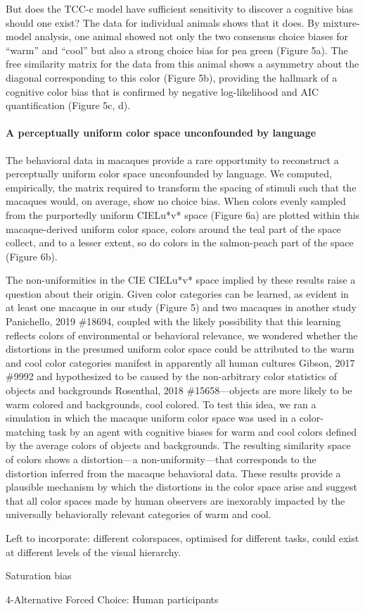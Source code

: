 But does the TCC-c model have sufficient sensitivity to discover a cognitive bias should one exist? The data for individual animals shows that it does. By mixture-model analysis, one animal showed not only the two consensus choice biases for “warm” and “cool” but also a strong choice bias for pea green (Figure 5a). The free similarity matrix for the data from this animal shows a asymmetry about the diagonal corresponding to this color (Figure 5b), providing the hallmark of a cognitive color bias that is confirmed by negative log-likelihood and AIC quantification (Figure 5c, d). 

\paragraph{A perceptually uniform color space unconfounded by language}
The behavioral data in macaques provide a rare opportunity to reconstruct a perceptually uniform color space unconfounded by language. We computed, empirically, the matrix required to transform the spacing of stimuli such that the macaques would, on average, show no choice bias. When colors evenly sampled from the purportedly uniform CIELu*v* space (Figure 6a) are plotted within this macaque-derived uniform color space, colors around the teal part of the space collect, and to a lesser extent, so do colors in the salmon-peach part of the space (Figure 6b). 

The non-uniformities in the CIE CIELu*v* space implied by these results raise a question about their origin. Given color categories can be learned, as evident in at least one macaque in our study (Figure 5) and two macaques in another study {Panichello, 2019 \#18694}, coupled with the likely possibility that this learning reflects colors of environmental or behavioral relevance, we wondered whether the distortions in the presumed uniform color space could be attributed to the warm and cool color categories manifest in apparently all human cultures {Gibson, 2017 \#9992} and hypothesized to be caused by the non-arbitrary color statistics of objects and backgrounds {Rosenthal, 2018 \#15658}—objects are more likely to be warm colored and backgrounds, cool colored. To test this idea, we ran a simulation in which the macaque uniform color space was used in a color-matching task by an agent with cognitive biases for warm and cool colors defined by the average colors of objects and backgrounds. The resulting similarity space of colors shows a distortion—a non-uniformity—that corresponds to the distortion inferred from the macaque behavioral data. These results provide a plausible mechanism by which the distortions in the color space arise and suggest that all color spaces made by human observers are inexorably impacted by the universally behaviorally relevant categories of warm and cool. 

Left to incorporate: 
different colorspaces, optimised for different tasks, could exist at different levels of the visual hierarchy. 

Saturation bias

4-Alternative Forced Choice: Human participants


